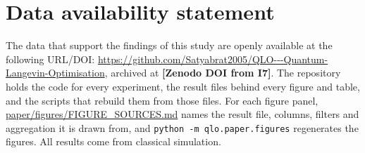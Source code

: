 
\section*{Data availability statement}

The data that support the findings of this study are openly available at the following URL/DOI:
\url{https://github.com/Satyabrat2005/QLO---Quantum-Langevin-Optimisation}, archived at
\textbf{[Zenodo DOI from I7]}. The repository holds the code for every experiment, the result files behind every
figure and table, and the scripts that rebuild them from those files. For each figure panel,
\url{paper/figures/FIGURE_SOURCES.md} names the result file, columns, filters and aggregation it is drawn from, and
\texttt{python -m qlo.paper.figures} regenerates the figures. All results come from classical simulation.
